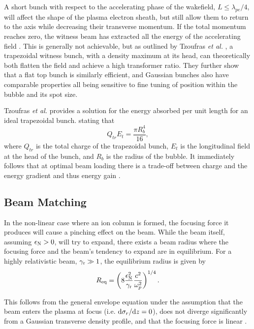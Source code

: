 A short bunch with respect to the accelerating phase of the wakefield, $L \leq \lambda_{pe}/4$, will affect the shape of the plasma electron sheath, but still allow them to return to the axis while decreasing their transverse momentum. If the total momentum reaches zero, the witness beam has extracted all the energy of the accelerating field \cite{lu:2006a,lu:2006}. This is generally not achievable, but as outlined by Tzoufras \textit{et al.} \cite{tzoufras:2009}, a trapezoidal witness bunch, with a density maximum at its head, can theoretically both flatten the field and achieve a high transformer ratio. They further show that a flat top bunch is similarly efficient, and Gaussian bunches also have comparable properties \dash all being sensitive to fine tuning of position within the bubble and its spot size.

Tzoufras \textit{et al.} provides a solution for the energy absorbed per unit length for an ideal trapezoidal bunch. stating that
\begin{equation}
    Q_{tr}E_{t} = \frac{\pi R_{b}^{4}}{16}, \label{EQ:Trapez}
\end{equation}
where $Q_{tr}$ is the total charge of the trapezoidal bunch, $E_{t}$ is the longitudinal field at the head of the bunch, and $R_{b}$ is the radius of the bubble. It immediately follows that at optimal beam loading there is a trade-off between charge and the energy gradient and thus energy gain \cite{tzoufras:2009}.

\subsection{Beam Matching}
\label{Int:BPI:Match}

In the non-linear case where an ion column is formed, the focusing force it produces will cause a pinching effect on the beam. While the beam itself, assuming $\epsilon_{\mathrm{N}} > 0$, will try to expand, there exists a beam radius where the focusing force and the beam's tendency to expand are in equilibrium. For a highly relativistic beam, $\gamma_{\mathrm{r}} \gg 1$, the equilibrium radius is given by \cite{krall:1995}
\begin{equation}
    R_{\mathrm{eq}} = \left( 8 \frac{\epsilon_{\mathrm{N}}^2}{\gamma_{\mathrm{r}}} \frac{c^2}{\omega_{p}^2} \right)^{1/4}. \label{EQ:BMatch}
\end{equation}

This follows from the general envelope equation \cite{lee:1976} under the assumption that the beam enters the plasma at focus (i.e. $\mathrm{d}\sigma_{r}/\mathrm{d} z = 0$), does not diverge significantly from a Gaussian transverse density profile, and that the focusing force is linear \cite{krall:1995}.

